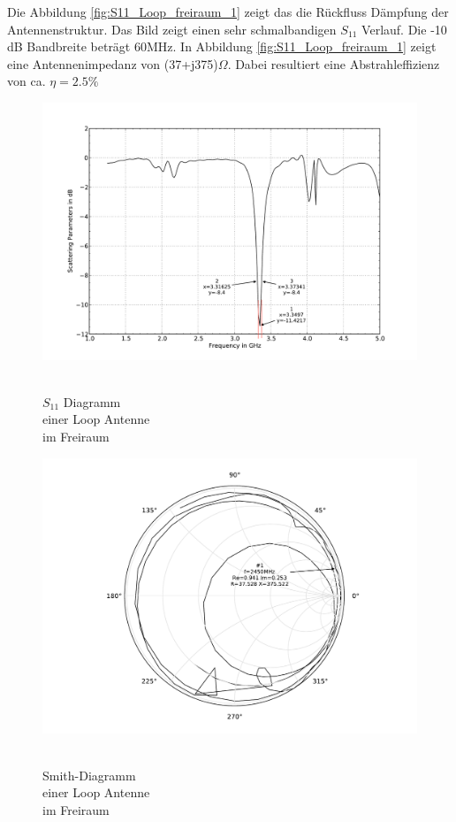 Die Abbildung \ref{fig:S11_Loop_freiraum_1} zeigt das die Rückfluss Dämpfung der Antennenstruktur. Das Bild zeigt einen sehr schmalbandigen $S_{11}$ Verlauf. Die -10 dB Bandbreite beträgt 60MHz. In Abbildung \ref{fig:S11_Loop_freiraum_1} zeigt eine Antennenimpedanz von (37+j375)$\Omega$. Dabei resultiert eine Abstrahleffizienz von ca. $\eta=2.5\%$
\begin{figure}[!ht]
\begin{center}
  \includegraphics[width=\linewidth]{content/bilder/Evaluation/Loop/ohneABS/S11_Loop_Coil_ohneABS.pdf}
  \caption{\\$S_{11}$ Diagramm \\einer Loop Antenne \\ im Freiraum}\label{fig:S11_Loop_freiraum_1}
\endminipage%
{}
  \includegraphics[width=\linewidth]{content/bilder/Evaluation/Loop/ohneABS/Smith_Loop_Coil_ohneABS.pdf}
  \caption{\\Smith-Diagramm \\einer Loop Antenne \\ im Freiraum}\label{fig:Smith_Loop_freiraum_2}
\endminipage
\end{center}
\end{figure}
